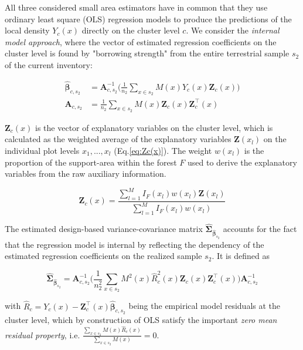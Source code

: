 All three considered small area estimators have in common that they use ordinary least square (OLS) regression models to produce the predictions of the local density $Y_{c}(x)$ directly on the cluster level $c$. We consider the \textit{internal model approach}, where the vector of estimated regression coefficients on the cluster level is found by "borrowing strength" from the entire terrestrial sample $s_2$ of the current inventory:

\begin{subequations}\label{normequ_simple_cluster}
	\begin{align}
\hat{\pmb{\beta}}_{c,s_2} &= \pmb{A}_{c,s_2}^{-1} \Big(\frac{1}{n_2}\sum_{x\in{s_2}}M(x)Y_{c}(x)\pmb{Z}_{c}(x)\Big) \\
\pmb{A}_{c,s_2} &=\frac{1}{n_2}\sum_{x\in{s_2}}M(x)\pmb{Z}_{c}(x)\pmb{Z}_{c}^{\top}(x)
	\end{align}
\end{subequations}

\noindent $\pmb{Z}_{c}(x)$ is the vector of explanatory variables on the cluster level, which is calculated as the weighted average of the explanatory variables $\pmb{Z}(x_l)$ on the individual plot levels $x_1, ..., x_l$ (Eq.\ref{eq:Zc(x)}). The weight $w(x_l)$ is the proportion of the support-area within the forest $F$ used to derive the explanatory variables from the raw auxiliary information.

\begin{equation}\label{eq:Zc(x)}
\pmb{Z}_{c}(x)=\frac{\sum_{l=1}^{M}I_{F}(x_l)w(x_l)\pmb{Z}(x_l)}{\sum_{l=1}^{M}I_{F}(x_l)w(x_l)}
\end{equation}

\noindent The estimated design-based variance-covariance matrix $\hat{\pmb{\Sigma}}_{\hat{\pmb{\beta}}_{s_2}}$ accounts for the fact that the regression model is internal by reflecting the dependency of the estimated regression coefficients on the realized sample $s_2$. It is defined as

\begin{equation}\label{eq:varcovarbeta}
\hat{\pmb{\Sigma}}_{\hat{\pmb{\beta}}_{s_2}}=\pmb{A}_{c,s_2}^{-1}
\Big(\frac{1}{n_2^2}\sum_{x\in{s_2}}M^{2}(x)\hat{R}_{c}^2(x)\pmb{Z}_{c}(x)\pmb{Z}_{c}^{\top}(x)\Big)
\pmb{A}_{c,s_2}^{-1}
\end{equation}

\noindent with $\hat{R}_{c}=Y_{c}(x)-\pmb{Z}_{c}^{\top}(x)\hat{\pmb{\beta}}_{c,s_2}$ being the empirical model residuals at the cluster level, which by construction of OLS satisfy the important \textit{zero mean residual property}, i.e. $\frac{\sum_{x \in s_{2}} M(x) \hat{R}_{c}(x)}{\sum_{x \in s_{2}} M(x)}=0$.\\

